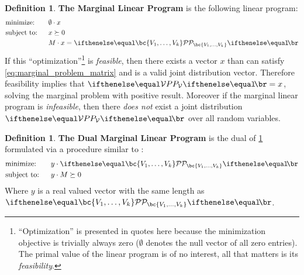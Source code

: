 \documentclass[aps, 10pt, english, twoside, pra, nofootinbib, longbibliography]{revtex4-1}
\theoremstyle{plain}
\theoremstyle{definition}
\newtheorem{definition}[theorem]{Definition}
\theoremstyle{remark}
\newcommand{\term}[1]{\textcolor{Mahogany}{\textbf{#1}}}
\begin{document}
    \begin{definition}
        \label{def:marginal_linear_program}
        \term{The Marginal Linear Program} is the following linear program:
        \begin{alignat*}{2}
            & \text{minimize:} \quad&& \emptyset \cdot x\\
            & \text{subject to:} && x \succeq 0 \\
            & && M \cdot x = \probvec[\bc{V_1, \ldots, V_k}]
        \end{alignat*}
        If this ``optimization''\footnote{``Optimization'' is presented in quotes here because the minimization objective is trivially always zero ($\emptyset$ denotes the null vector of all zero entries). The primal value of the linear program is of no interest, all that matters is its \textit{feasibility}.} is \textit{feasible}, then there exists a vector $x$ than can satisfy \cref{eq:marginal_problem_matrix} and is a valid joint distribution vector. Therefore feasibility implies that $\prob[\mathcal{V}] = x$, solving the marginal problem with positive result. Moreover if the marginal linear program is \textit{infeasible}, then there \textit{does not} exist a joint distribution $\prob[\mathcal{V}]$ over all random variables.
    \end{definition}
    \begin{definition}
        \label{def:dual_marginal_linear_program}
        \term{The Dual Marginal Linear Program} is the dual of \cref{def:marginal_linear_program} formulated via a procedure similar to \cite{Lahaie_2008}:
        \begin{alignat*}{2}
            & \text{minimize:} \quad&& y \cdot \probvec[\bc{V_1, \ldots, V_k}]\\
            & \text{subject to:} && y \cdot M \succeq 0
        \end{alignat*}
        Where $y$ is a real valued vector with the same length as $\probvec[\bc{V_1, \ldots, V_k}]$.
    \end{definition}
\end{document}

